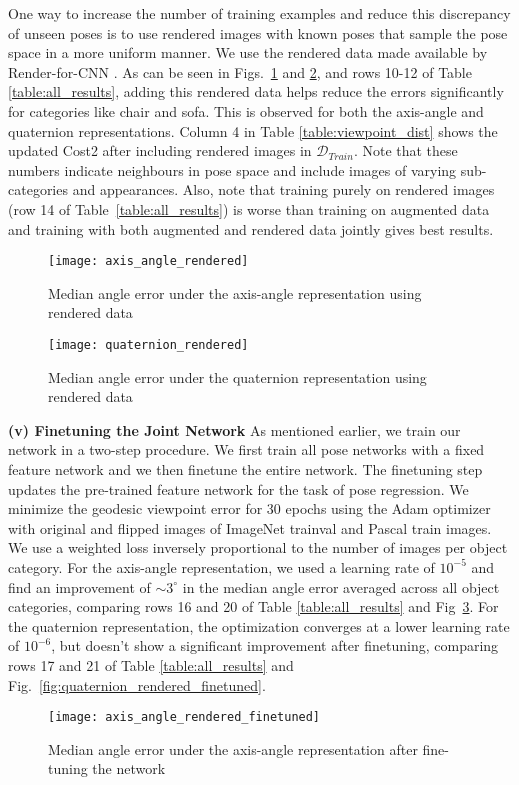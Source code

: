 \documentclass[10pt,twocolumn,letterpaper]{article}
\newcommand{\myparagraph}[1]{\smallskip\noindent\textbf{#1}}
\begin{document}
	One way to increase the number of training examples and reduce this discrepancy of unseen poses is to use rendered images with known poses that sample the pose space in a more uniform manner. We use the rendered data made available by Render-for-CNN \cite{Su:ICCV15}. As can be seen in Figs.~\ref{fig:axis_angle_rendered} and \ref{fig:quaternion_rendered}, and rows 10-12 of Table \ref{table:all_results}, adding this rendered data helps reduce the errors significantly for categories like chair and sofa. This is observed for both the axis-angle and quaternion representations. Column 4 in Table \ref{table:viewpoint_dist} shows the updated Cost2 after including rendered images in $\mathcal{D}_{Train}$. Note that these numbers indicate neighbours in pose space and include images of varying sub-categories and appearances. Also, note that training purely on rendered images (row 14 of Table~\ref{table:all_results}) is worse than training on augmented data and training with both augmented and rendered data jointly gives best results.

	\begin{figure}[h]
		\centering
		\texttt{[image: axis\_angle\_rendered]}
		\caption{Median angle error under the axis-angle representation using rendered data}
		\label{fig:axis_angle_rendered}
	\end{figure}
	
	\begin{figure}[h]
		\centering
		\texttt{[image: quaternion\_rendered]}
		\caption{Median angle error under the quaternion representation using rendered data}
		\label{fig:quaternion_rendered}
	\end{figure}

	\myparagraph{(v) Finetuning the Joint Network} 
	As mentioned earlier, we train our network in a two-step procedure. We first train all pose 
	networks with a fixed feature network and we then finetune the entire network. The finetuning  step updates the pre-trained feature network for the task of pose regression. We minimize the 
	geodesic viewpoint error for 30 epochs using the Adam optimizer with original and flipped 
	images of ImageNet trainval and Pascal train images. We use a weighted loss inversely proportional to the number of images per object category. For the axis-angle representation, we used a learning rate of $10^{-5}$ and find an improvement of $\sim 3^\circ$ in the median angle error averaged across all object categories, comparing rows 16 and 20 of Table \ref{table:all_results} and Fig~\ref{fig:axis_angle_rendered_finetuned}. For the quaternion representation, the optimization converges at a lower learning rate of $10^{-6}$, but doesn't	show a significant improvement after finetuning, comparing rows 17 and 21 of Table \ref{table:all_results} and Fig.~\ref{fig:quaternion_rendered_finetuned}.
	\begin{figure}[h]
		\centering
		\texttt{[image: axis\_angle\_rendered\_finetuned]}
		\caption{Median angle error under the axis-angle representation after fine-tuning the network}
		\label{fig:axis_angle_rendered_finetuned}
	\end{figure}
	
\end{document}
